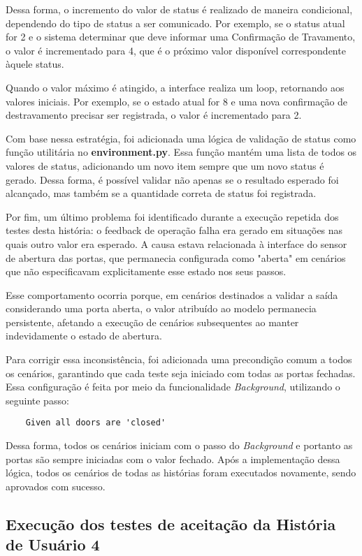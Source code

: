 Dessa forma, o incremento do valor de status é realizado de maneira condicional, dependendo do tipo de status a ser comunicado. Por exemplo, se o status atual 
for 2 e o sistema determinar que deve informar uma Confirmação de Travamento, o valor é incrementado para 4, que é o próximo valor disponível correspondente àquele status.

Quando o valor máximo é atingido, a interface realiza um loop, retornando aos valores iniciais. Por exemplo, se o estado atual for 8 e uma nova confirmação de 
destravamento precisar ser registrada, o valor é incrementado para 2.

Com base nessa estratégia, foi adicionada uma lógica de validação de status como função utilitária no \textbf{environment.py}. Essa função mantém uma lista de todos os valores 
de status, adicionando um novo item sempre que um novo status é gerado. Dessa forma, é possível validar não apenas se o resultado esperado foi alcançado, mas também se 
a quantidade correta de status foi registrada.

Por fim, um último problema foi identificado durante a execução repetida dos testes desta história: o feedback de operação falha era gerado em situações nas quais outro 
valor era esperado. A causa estava relacionada à interface do sensor de abertura das portas, que permanecia configurada como "aberta" em cenários que não especificavam 
explicitamente esse estado nos seus passos.

Esse comportamento ocorria porque, em cenários destinados a validar a saída considerando uma porta aberta, o valor atribuído ao modelo permanecia persistente, afetando 
a execução de cenários subsequentes ao manter indevidamente o estado de abertura.

Para corrigir essa inconsistência, foi adicionada uma precondição comum a todos os cenários, garantindo que cada teste seja iniciado com todas as portas fechadas. Essa 
configuração é feita por meio da funcionalidade \textit{Background}, utilizando o seguinte passo:

\begin{verbatim}
	Given all doors are 'closed'
\end{verbatim}

Dessa forma, todos os cenários iniciam com o passo do \textit{Background} e portanto as portas são sempre iniciadas com o valor fechado. Após a implementação dessa 
lógica, todos os cenários de todas as histórias foram executados novamente, sendo aprovados com sucesso.


\subsection{Execução dos testes de aceitação da História de Usuário 4}

